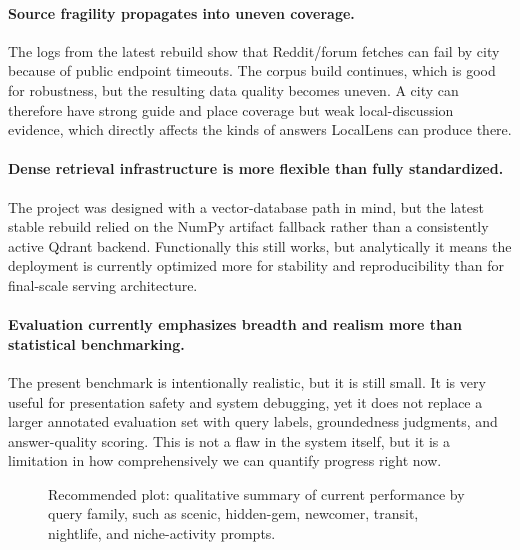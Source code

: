 \documentclass[11pt]{article}
\begin{document}
\paragraph{Source fragility propagates into uneven coverage.}
The logs from the latest rebuild show that Reddit/forum fetches can fail by city because of public endpoint timeouts. The corpus build continues, which is good for robustness, but the resulting data quality becomes uneven. A city can therefore have strong guide and place coverage but weak local-discussion evidence, which directly affects the kinds of answers LocalLens can produce there.

\paragraph{Dense retrieval infrastructure is more flexible than fully standardized.}
The project was designed with a vector-database path in mind, but the latest stable rebuild relied on the NumPy artifact fallback rather than a consistently active Qdrant backend. Functionally this still works, but analytically it means the deployment is currently optimized more for stability and reproducibility than for final-scale serving architecture.

\paragraph{Evaluation currently emphasizes breadth and realism more than statistical benchmarking.}
The present benchmark is intentionally realistic, but it is still small. It is very useful for presentation safety and system debugging, yet it does not replace a larger annotated evaluation set with query labels, groundedness judgments, and answer-quality scoring. This is not a flaw in the system itself, but it is a limitation in how comprehensively we can quantify progress right now.

\begin{figure}[H]
\centering
{}
\caption{Recommended plot: qualitative summary of current performance by query family, such as scenic, hidden-gem, newcomer, transit, nightlife, and niche-activity prompts.}
\label{fig:query-family-summary}
\end{figure}
\end{document}

